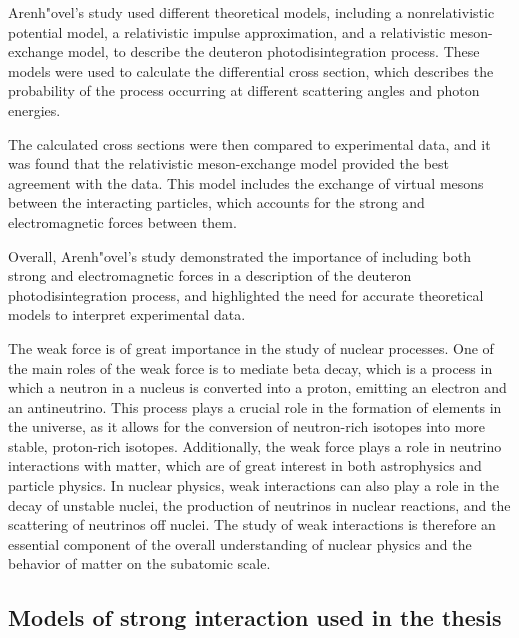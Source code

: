 Arenh"{o}vel's study \cite{ArenhovelPhotodisint1991} used different theoretical models, including a nonrelativistic potential model,
a relativistic impulse approximation, and a relativistic meson-exchange model, to describe the deuteron photodisintegration process.
These models were used to calculate the differential cross section, which describes the probability
of the process occurring at different scattering angles and photon energies.

The calculated cross sections were then compared to experimental data, and it was
found that the relativistic meson-exchange model provided
the best agreement with the data. This model includes the exchange of virtual mesons
between the interacting particles, which accounts for
the strong and electromagnetic forces between them.

Overall, Arenh"{o}vel's study demonstrated the importance of including both strong
and electromagnetic forces in a description of the deuteron photodisintegration process,
and highlighted the need for accurate theoretical models to interpret experimental data.


The weak force is of great importance in the study of nuclear processes. One of the main roles of the weak force is to mediate beta decay,
which is a process in which a neutron in a nucleus is converted into a proton, emitting an electron and an antineutrino. This process plays
a crucial role in the formation of elements in the universe, as it allows for the conversion of neutron-rich isotopes into more stable,
proton-rich isotopes. Additionally, the weak force plays a role in neutrino interactions with matter, which are of great interest in both
astrophysics and particle physics. In nuclear physics, weak interactions can also play a role in the decay of unstable nuclei, the
production of neutrinos in nuclear reactions, and the scattering of neutrinos off nuclei. The study of weak interactions is therefore an
essential component of the overall understanding of nuclear physics and the behavior of matter on the subatomic scale.



\subsection*{Models of strong interaction used in the thesis}

